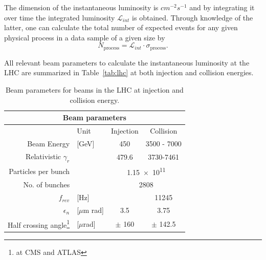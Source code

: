 The dimension of the instantaneous luminosity is $cm^{-2}s^{-1}$ and by integrating it over time
the integrated luminosity $\mathcal{L}_{int}$ is obtained. Through knowledge of the latter, one can calculate the total number
of expected events for any given physical process in a data sample of a given size by
\begin{equation}
    N_{\text{process}} = \mathcal{L}_{int} \cdot \sigma_{\text{process}}.
\end{equation}

All relevant beam parameters to calculate the instantaneous luminosity at the LHC are summarized in Table~\ref{tab:lhc}
at both injection and collision energies. 

\begin{table}
    \begin{center}
    \caption{Beam parameters for beams in the LHC at injection and collision energy.}
    \label{tab:lhc}
    \begin{tabular}{ r l | c | c }
    \multicolumn{4}{c}{\textbf{Beam parameters}} \\                                                                                            \hline
                                                                & Unit         & Injection                                    & Collision \\   \hline \hline
    Beam Energy                                                 & [GeV]        & 450                                          & 3500 - 7000 \\ \hline
    Relativistic $\gamma_r$                                     &              & 479.6                                        & 3730-7461  \\  \hline
    Particles per bunch                                         &              & \multicolumn{2}{c}{\num{1.15e11}} \\                          \hline
    No. of bunches                                              &              & \multicolumn{2}{c}{2808} \\                                   \hline
    $f_{rev}$                                                   & [Hz]         &                                              & 11245 \\       \hline
    $\epsilon_n$                                                & [$\mu$m rad] & 3.5                                          & 3.75 \\        \hline
    Half crossing angle\footnote{\label{note1}at CMS and ATLAS} & [$\mu$rad]   & $\pm$ 160                                    & $\pm$ 142.5 \\ \hline

\end{tabular}
\end{center}
\end{table}
